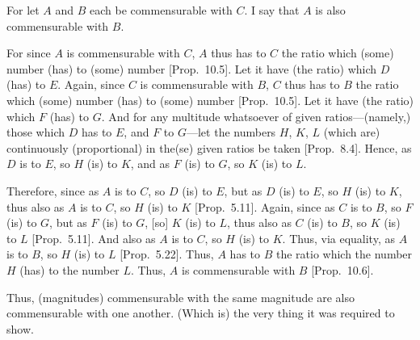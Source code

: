 \begin{Parallel}{}{}
{For let $A$ and $B$ each be commensurable with $C$. I say that
$A$ is also commensurable with $B$.

For since $A$ is commensurable with $C$, $A$ thus has to $C$ the
ratio which (some) number (has) to (some) number [Prop.~10.5]. Let it have (the ratio) which $D$ (has)
to $E$. Again, since $C$ is commensurable with $B$, $C$ thus has to $B$
the ratio which (some) number (has) to (some) number [Prop.~10.5].  Let it have (the ratio) which $F$ (has) to $G$. And for any multitude whatsoever of given ratios---(namely,) those
which $D$ has to $E$, and $F$ to $G$---let the numbers $H$, $K$, $L$
(which are) continuously (proportional) in the(se) given ratios be taken [Prop.~8.4]. Hence, as $D$ is to $E$, so $H$ (is) to $K$, and as $F$ (is) to $G$, so $K$ (is) to $L$.

\centerline{}

Therefore, since as $A$ is to $C$, so $D$ (is) to $E$, but as $D$ (is) to 
$E$, so $H$ (is) to $K$, thus also as $A$ is to $C$, so $H$ (is) to $K$
[Prop.~5.11]. Again, since as $C$ is to $B$, 
so $F$ (is) to $G$, but as $F$ (is) to $G$, [so] $K$ (is) to $L$, 
thus also as $C$ (is) to $B$, so $K$ (is) to $L$ [Prop.~5.11]. And also as $A$ is to $C$, so $H$ (is) to $K$. Thus, via equality, as $A$ is to $B$, so $H$ (is) to $L$ [Prop.~5.22]. Thus, $A$ has to $B$ the ratio
which the number $H$ (has) to the number $L$. Thus, $A$ is commensurable
with $B$ [Prop.~10.6].

Thus, (magnitudes) commensurable with the same magnitude are also commensurable with one another. (Which is) the very thing it was required
to show.}
\end{Parallel}

